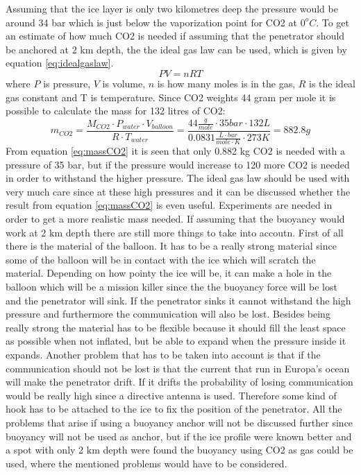 \noindent
Assuming that the ice layer is only two kilometres deep the pressure would be around 34 bar which is just below the vaporization point for CO2 at $0^oC$. To get an estimate of how much CO2 is needed if assuming that the penetrator should be anchored at 2 km depth, the the ideal gas law can be used, which is given by equation \ref{eq:idealgaslaw}. 
\begin{equation} \label{eq:idealgaslaw}
PV = nRT
\end{equation}
where $P$ is pressure, $V$ is volume, $n$ is how many moles is in the gas, $R$ is the ideal gas constant and T is temperature. Since CO2 weights 44 gram per mole it is possible to calculate the mass for 132 litres of CO2: 
\begin{equation}\label{eq:massCO2}
m_{CO2} = \frac{M_{CO2} \cdot P_{water}\cdot V_{balloon}}{R\cdot T_{water}} = \frac{44 \frac{g}{mole} \cdot 35 bar \cdot 132 L}{0.0831  \frac{L\cdot bar}{mole \cdot K} \cdot 273K} = 882.8 g
\end{equation}
From equation \ref{eq:massCO2} it is seen that only 0.882 kg CO2 is needed with a pressure of 35 bar, but if the pressure would increase to 120 more CO2 is needed in order to withstand the higher pressure. The ideal gas law should be used with very much care since at these high pressures and it can be discussed whether the result from equation \ref{eq:massCO2} is even useful. Experiments are needed in order to get a more realistic mass needed. If assuming that the buoyancy would work at 2 km depth there are still more things to take into accoutn. First of all there is the material of the balloon. It has to be a really strong material since some of the balloon will be in contact with the ice which will scratch the material. Depending on how pointy the ice will be, it can make a hole in the balloon which will be a mission killer since the the buoyancy force will be lost and the penetrator will sink. If the penetrator sinks it cannot withstand the high pressure and furthermore the communication will also be lost. Besides being really strong the material has to be flexible because it should fill the least space as possible when not inflated, but be able to expand when the pressure inside it expands. Another problem that has to be taken into account is that if the communication should not be lost is that the current that run in Europa's ocean will make the penetrator drift. If it drifts the probability of losing communication would be really high since a directive antenna is used.  Therefore some kind of hook has to be attached to the ice to fix the position of the penetrator. All the problems that arise if using a buoyancy anchor will not be discussed further since buoyancy will not be used as anchor, but if the ice profile were known better and a spot with only 2 km depth were found the buoyancy using CO2 as gas could be used, where the mentioned problems would have to be considered. \\



